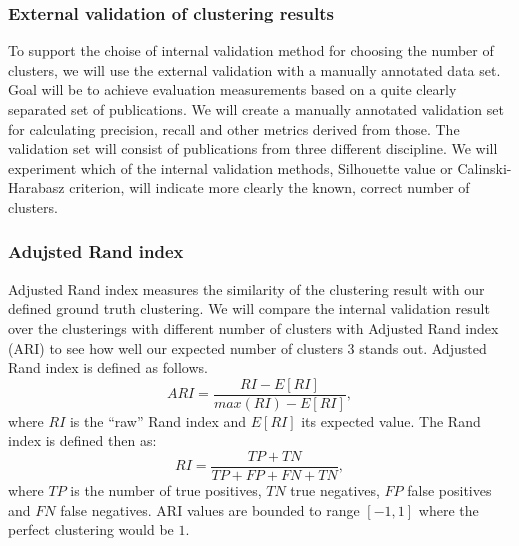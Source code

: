 \subsubsection{External validation of clustering results}
\label{sec:ext_val}
To support the choise of internal validation method for choosing
the number of clusters, we will use the external validation 
with a manually annotated data set. 
Goal will be to achieve evaluation measurements based on a quite 
clearly separated set of publications. 
We will create a manually annotated validation set for calculating
precision, recall and other metrics derived from those.
The validation set will consist of publications from three different
discipline. We will experiment which of the internal validation
methods, Silhouette value or Calinski-Harabasz criterion, will
indicate more clearly the known, correct number of clusters.

\subsubsection{Adujsted Rand index}
Adjusted Rand index measures the similarity of the clustering result
with our defined ground truth clustering. We will compare the 
internal validation result over the clusterings with different number 
of clusters with Adjusted Rand index (ARI) 
\cite{hubert_comparing_1985} to see how well our expected number 
of clusters $3$ stands out. Adjusted Rand index is defined as 
follows.
\begin{equation}
 ARI = \frac{RI - E[RI]}{max(RI) - E[RI]},
\end{equation}
where $RI$ is the ``raw'' Rand index and $E[RI]$ its expected
value. The Rand index is defined then as:
\begin{equation}
  RI = \frac{TP + TN}{TP + FP + FN + TN},
\end{equation}
where $TP$ is the number of true positives, $TN$ true negatives, 
$FP$ false positives and $FN$ false negatives. ARI values are 
bounded to range $[-1, 1]$ where the perfect clustering would 
be $1$.

